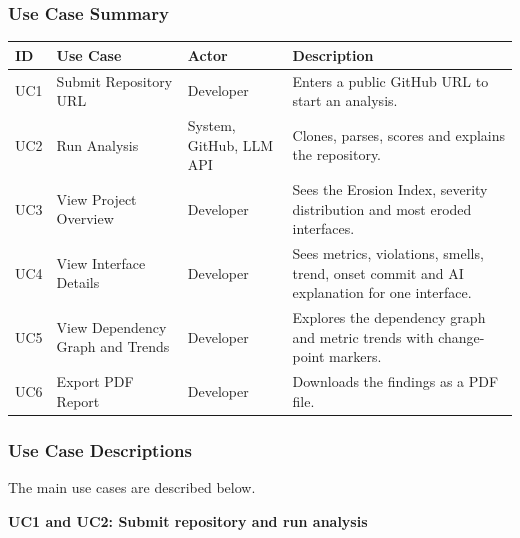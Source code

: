 \documentclass[12pt,a4paper]{article}
\begin{document}
\subsubsection{Use Case Summary}

\begin{table}[H]
\centering
\renewcommand{\arraystretch}{1.5}
\setlength{\tabcolsep}{6pt}

\begin{tabular}{|L{0.45in}|L{1.4in}|L{1.0in}|L{2.15in}|}
\hline
\textbf{ID} & \textbf{Use Case} & \textbf{Actor} & \textbf{Description} \\
\hline
UC1 & Submit Repository URL & Developer & Enters a public GitHub URL to start an analysis. \\
\hline
UC2 & Run Analysis & System, GitHub, LLM API & Clones, parses, scores and explains the repository. \\
\hline
UC3 & View Project Overview & Developer & Sees the Erosion Index, severity distribution and most eroded interfaces. \\
\hline
UC4 & View Interface Details & Developer & Sees metrics, violations, smells, trend, onset commit and AI explanation for one interface. \\
\hline
UC5 & View Dependency Graph and Trends & Developer & Explores the dependency graph and metric trends with change-point markers. \\
\hline
UC6 & Export PDF Report & Developer & Downloads the findings as a PDF file. \\
\hline
\end{tabular}
\end{table}

\subsubsection{Use Case Descriptions}

\begin{spacing}{1.5}
\justifying
The main use cases are described below.

\textbf{UC1 and UC2: Submit repository and run analysis}
\end{spacing}
\end{document}
